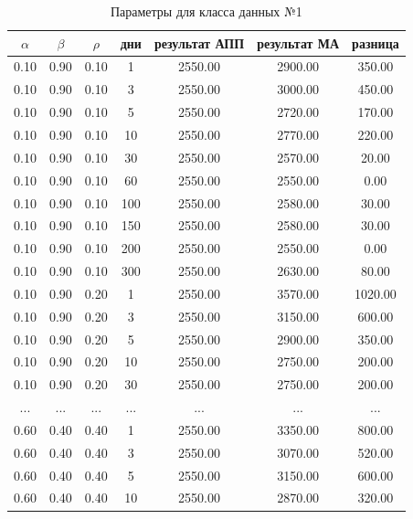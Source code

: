 \begin{table}[H]
    \centering
    \caption{Параметры для класса данных №1}
    \label{tab:class_1}
    \begin{tabular}{|c|c|c|c|c|c|c|}
        \hline
        $\alpha$ & $\beta$ & $\rho$ & дни & результат АПП & результат МА & разница \\
        \hline
  0.10 &   0.90 &   0.10 &      1 &    2550.00 &    2900.00 &     350.00  \\
  0.10 &   0.90 &   0.10 &      3 &    2550.00 &    3000.00 &     450.00  \\
  0.10 &   0.90 &   0.10 &      5 &    2550.00 &    2720.00 &     170.00  \\
  0.10 &   0.90 &   0.10 &     10 &    2550.00 &    2770.00 &     220.00  \\
  0.10 &   0.90 &   0.10 &     30 &    2550.00 &    2570.00 &      20.00  \\
  0.10 &   0.90 &   0.10 &     60 &    2550.00 &    2550.00 &       0.00  \\
  0.10 &   0.90 &   0.10 &    100 &    2550.00 &    2580.00 &      30.00  \\
  0.10 &   0.90 &   0.10 &    150 &    2550.00 &    2580.00 &      30.00  \\
  0.10 &   0.90 &   0.10 &    200 &    2550.00 &    2550.00 &       0.00  \\
  0.10 &   0.90 &   0.10 &    300 &    2550.00 &    2630.00 &      80.00  \\
  0.10 &   0.90 &   0.20 &      1 &    2550.00 &    3570.00 &    1020.00  \\
  0.10 &   0.90 &   0.20 &      3 &    2550.00 &    3150.00 &     600.00  \\
  0.10 &   0.90 &   0.20 &      5 &    2550.00 &    2900.00 &     350.00  \\
  0.10 &   0.90 &   0.20 &     10 &    2550.00 &    2750.00 &     200.00  \\
  0.10 &   0.90 &   0.20 &     30 &    2550.00 &    2750.00 &     200.00  \\
  ... &   ... &   ... &    ... &    ... &    ... &      ...  \\
   0.60 &   0.40 &   0.40 &      1 &    2550.00 &    3350.00 &     800.00  \\
  0.60 &   0.40 &   0.40 &      3 &    2550.00 &    3070.00 &     520.00  \\
  0.60 &   0.40 &   0.40 &      5 &    2550.00 &    3150.00 &     600.00  \\
  0.60 &   0.40 &   0.40 &     10 &    2550.00 &    2870.00 &     320.00  \\

\end{tabular}
\end{table}

